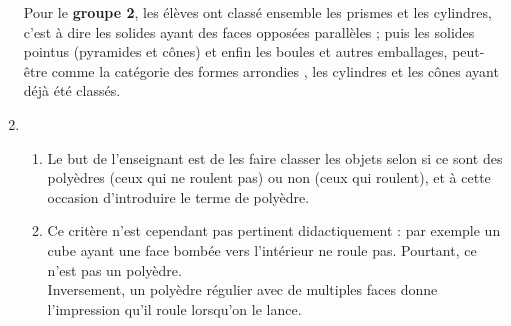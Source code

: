 \begin{enumerate}
   Pour le \textbf{groupe 2}, les élèves ont classé ensemble les prismes et les cylindres, c'est à dire les solides ayant des faces opposées parallèles ; puis les solides \og pointus \fg{} (pyramides et cônes) et enfin les boules et autres emballages, peut-être comme la catégorie des formes \og arrondies \fg{}, les cylindres et les cônes ayant déjà été classés.
   \item
   \begin{enumerate}
      \item Le but de l'enseignant est de les faire classer les objets selon si ce sont des polyèdres (ceux qui ne roulent pas) ou non (ceux qui roulent), et à cette occasion d'introduire le terme de polyèdre.
      \item Ce critère n'est cependant pas pertinent didactiquement : par exemple un cube ayant une face bombée vers l'intérieur ne roule pas. Pourtant, ce n'est pas un polyèdre. \\
      Inversement, un polyèdre régulier avec de multiples faces donne l'impression qu'il roule lorsqu'on le lance.
    \end{enumerate}
\end{enumerate}
